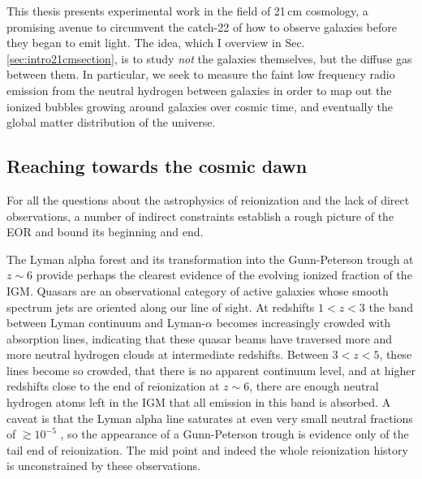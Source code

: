 This thesis presents experimental work in the field of 21\,cm cosmology, a promising avenue to circumvent the catch-22 of how to observe galaxies before they began to emit light. The idea, which I overview in Sec. \ref{sec:intro21cmsection}, is to study \textit{not} the galaxies themselves, but the diffuse gas between them. In particular, we seek to measure the faint low frequency radio emission from the neutral hydrogen between galaxies in order to map out the ionized bubbles growing around galaxies over cosmic time, and eventually the global matter distribution of the universe. 


\subsection{Reaching towards the cosmic dawn}

For all the questions about the astrophysics of reionization and the lack of direct observations, a number of indirect constraints establish a rough picture of the EOR and bound its beginning and end. 

The Lyman alpha forest and its transformation into the Gunn-Peterson trough at $z\sim6$ provide perhaps the clearest evidence of the evolving ionized fraction of the IGM. Quasars are an observational category of active galaxies whose smooth spectrum jets are oriented along our line of sight. At redshifts $1<z<3$ the band between Lyman continuum and Lyman-$\alpha$ becomes increasingly crowded with absorption lines, indicating that these quasar beams have traversed more and more neutral hydrogen clouds at intermediate redshifts. Between $3<z<5$, these lines become so crowded, that there is no apparent continuum level, and at higher redshifts close to the end of reionization at $z\sim6$, there are enough neutral hydrogen atoms left in the IGM that all emission in this band is absorbed. A caveat is that the Lyman alpha line saturates at even very small neutral fractions of $\gtrsim 10^{-5}$ \citep{FurlanettoReview}, so the appearance of a Gunn-Peterson trough is evidence only of the tail end of reionization. The mid point and indeed the whole reionization history is unconstrained by these observations.

